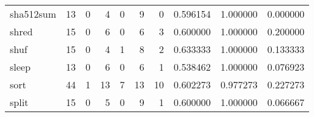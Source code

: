 \begin{longtable}{lrrrrrrrrr}
sha512sum &                                       13 &                                                  0 &                                                  4 &                                                  0 &                                                  9 &                                                  0 &                                           0.596154 &                               1.000000 &                             0.000000 \\
shred     &                                       15 &                                                  0 &                                                  6 &                                                  0 &                                                  6 &                                                  3 &                                           0.600000 &                               1.000000 &                             0.200000 \\
shuf      &                                       15 &                                                  0 &                                                  4 &                                                  1 &                                                  8 &                                                  2 &                                           0.633333 &                               1.000000 &                             0.133333 \\
sleep     &                                       13 &                                                  0 &                                                  6 &                                                  0 &                                                  6 &                                                  1 &                                           0.538462 &                               1.000000 &                             0.076923 \\
sort      &                                       44 &                                                  1 &                                                 13 &                                                  7 &                                                 13 &                                                 10 &                                           0.602273 &                               0.977273 &                             0.227273 \\
split     &                                       15 &                                                  0 &                                                  5 &                                                  0 &                                                  9 &                                                  1 &                                           0.600000 &                               1.000000 &                             0.066667 \\

\end{longtable}
